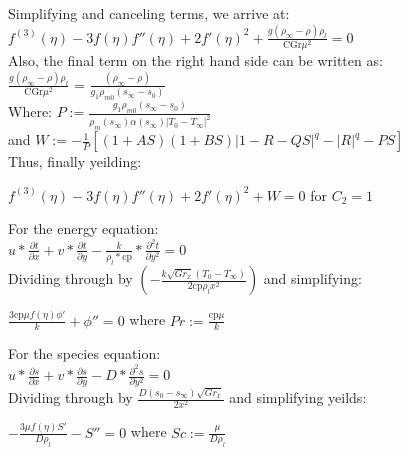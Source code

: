 \documentclass[letterpaper, 10pt]{article}
\begin{document}
	\noindent Simplifying and canceling terms, we arrive at:\\
	$f^{(3)}(\eta )-3 f(\eta ) f''(\eta )+2 f'(\eta )^2 + \frac{g (\rho_\infty - \rho) \rho_l}{\text{CGr} \mu^2} = 0 $\\

	\noindent Also, the final term on the right hand side can be written as:\\ 
	$\frac{g (\rho_\infty - \rho) \rho_l}{\text{CGr} \mu^2}$ = $\frac{(\rho_\infty - \rho)}{g_1 \rho_{m0} (s_\infty - s_0)}$\\ 
 
	\noindent Where: $P := \frac{g_1 \rho_{m0} (s_\infty - s_0)}{\rho_m (s_\infty) \alpha (s_\infty) |T_0 - T_\infty|^2}$\\ 
	and $W := -\frac{1}{P}\left[ (1+AS)(1+BS)|1-R-QS|^q-|R|^q-PS\right]$\\

	Thus, finally yeilding:\\
	\begin{center}
		$f^{(3)}(\eta )-3 f(\eta ) f''(\eta )+2 f'(\eta )^2 + W = 0 $ for $C_2 = 1$
	\end{center}

	\noindent For the energy equation:\\
	$u*\frac{\partial t}{\partial x}+v*\frac{\partial t}{\partial y}-\frac{k}{\rho_l*\text{cp}}*\frac{\partial^2 t}{\partial y^2} = 0$\\

	\noindent Dividing through by $\left(-\frac{k \sqrt{Gr_x} (T_0-T_\infty)}{2 \text{cp} \rho_l x^2}\right)$ and simplifying:\\
	\begin{center}
		$\frac{3 \text{cp} \mu  f(\eta ) \phi'}{k}+\phi'' = 0$ where $Pr := \frac{\text{cp} \mu}{k}$\\
	\end{center}
	For the species equation:\\
	$u*\frac{\partial s}{\partial x}+v*\frac{\partial s}{\partial y}-D*\frac{\partial^2 s}{\partial y^2} = 0$\\

	\noindent Dividing through by $\frac{D(s_0-s_\infty)\sqrt{Gr_x}}{2 x^2}$ and simplifying yeilds:\\
	\begin{center}
		$-\frac{3 \mu  f(\eta ) S'}{D \rho_l}-S'' = 0$ where $Sc := \frac{\mu}{D \rho_l} $
	\end{center}

\end{document}
